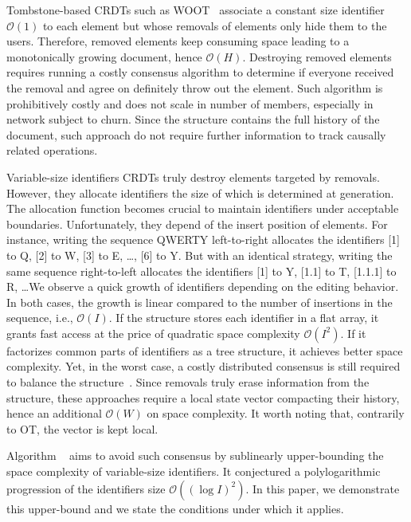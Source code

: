 \begin{asparadesc}
\item [Tombstone-based] CRDTs such as WOOT~\cite{oster2006data} associate a
  constant size identifier $\mathcal{O}(1)$ to each element but whose removals
  of elements only hide them to the users. Therefore, removed elements keep
  consuming space leading to a monotonically growing document, hence
  $\mathcal{O}(H)$.  Destroying removed elements requires running a costly
  consensus algorithm to determine if everyone received the removal and agree on
  definitely throw out the element. Such algorithm is prohibitively costly and
  does not scale in number of members, especially in network subject to
  churn. Since the structure contains the full history of the document, such
  approach do not require further information to track causally related
  operations.

\item [Variable-size identifiers] CRDTs truly destroy elements targeted by
  removals. However, they allocate identifiers the size of which is determined
  at generation. The allocation function becomes crucial to maintain identifiers
  under acceptable boundaries. Unfortunately, they depend of the insert position
  of elements. For instance, writing the sequence QWERTY left-to-right allocates
  the identifiers [1] to Q, [2] to W, [3] to E, \ldots, [6] to Y. But with an
  identical strategy, writing the same sequence right-to-left allocates the
  identifiers [1] to Y, [1.1] to T, [1.1.1] to R, \ldots We observe a quick
  growth of identifiers depending on the editing behavior. In both cases, the
  growth is linear compared to the number of insertions in the sequence, i.e.,
  $\mathcal{O}(I)$. If the structure stores each identifier in a flat array, it
  grants fast access at the price of quadratic space complexity
  $\mathcal{O}(I^2)$. If it factorizes common parts of identifiers as a tree
  structure, it achieves better space complexity. Yet, in the worst case, a
  costly distributed consensus is still required to balance the
  structure~\cite{zawirski2011asynchronous}. Since removals truly erase
  information from the structure, these approaches require a local state vector
  compacting their history, hence an additional $\mathcal{O}(W)$ on
  space complexity. It worth noting that, contrarily to OT, the vector is kept
  local.

  Algorithm \LSEQ~\cite{nedelec2013lseq} aims to avoid such consensus by
  sublinearly upper-bounding the space complexity of variable-size
  identifiers. It conjectured a polylogarithmic progression of the identifiers
  size $\mathcal{O}((\log I)^2)$.  In this paper, we demonstrate this upper-bound and we state the
  conditions under which it applies.

\end{asparadesc}

